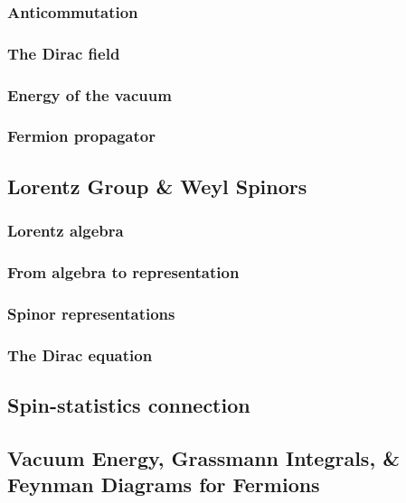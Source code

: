 \documentclass{book}
\theoremstyle{definition}
\begin{document}
\subsubsection{Anticommutation}
\subsubsection{The Dirac field}
\subsubsection{Energy of the vacuum}
\subsubsection{Fermion propagator}


\newpage

\subsection{Lorentz Group \& Weyl Spinors}

\subsubsection{Lorentz algebra}
\subsubsection{From algebra to representation}
\subsubsection{Spinor representations}
\subsubsection{The Dirac equation}


\newpage


\subsection{Spin-statistics connection}



\newpage



\subsection{Vacuum Energy, Grassmann Integrals, \& Feynman Diagrams for Fermions}
\end{document}
